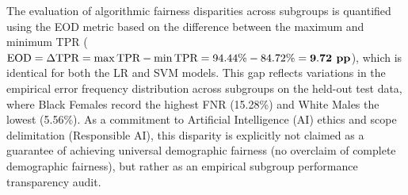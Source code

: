 The evaluation of algorithmic fairness disparities across subgroups is quantified using the EOD metric based on the difference between the maximum and minimum TPR ($\text{EOD} = \Delta \text{TPR} = \max \text{TPR} - \min \text{TPR} = 94.44\% - 84.72\% = \mathbf{9.72}\text{\textbf{ pp}}$), which is identical for both the LR and SVM models. This gap reflects variations in the empirical error frequency distribution across subgroups on the held-out test data, where Black Females record the highest FNR (15.28\%) and White Males the lowest (5.56\%). As a commitment to Artificial Intelligence (AI) ethics and scope delimitation (Responsible AI), this disparity is explicitly not claimed as a guarantee of achieving universal demographic fairness (no overclaim of complete demographic fairness), but rather as an empirical subgroup performance transparency audit.
